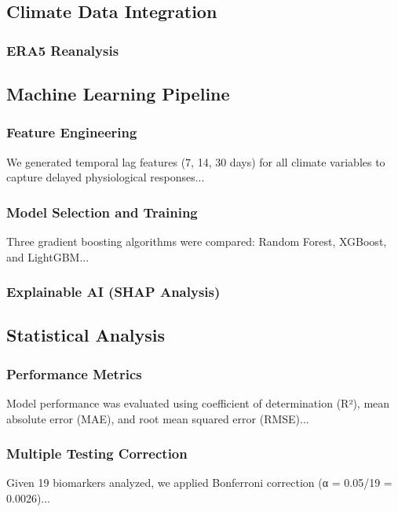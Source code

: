 \documentclass[11pt,a4paper]{article}
\begin{document}

\subsection{Climate Data Integration}

\subsubsection{ERA5 Reanalysis}

\subsection{Machine Learning Pipeline}

\subsubsection{Feature Engineering}
We generated temporal lag features (7, 14, 30 days) for all climate variables to capture delayed physiological responses...

\subsubsection{Model Selection and Training}
Three gradient boosting algorithms were compared: Random Forest, XGBoost, and LightGBM...

\subsubsection{Explainable AI (SHAP Analysis)}

\subsection{Statistical Analysis}

\subsubsection{Performance Metrics}
Model performance was evaluated using coefficient of determination (R²), mean absolute error (MAE), and root mean squared error (RMSE)...

\subsubsection{Multiple Testing Correction}
Given 19 biomarkers analyzed, we applied Bonferroni correction (α = 0.05/19 = 0.0026)...
\end{document}
